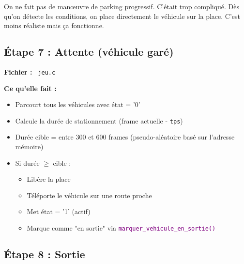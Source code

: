 \documentclass[11pt,a4paper]{article}
\newcommand{\fichier}[1]{\texttt{\textcolor{primary}{\faIcon{file-code} #1}}}
\newcommand{\fonction}[1]{\texttt{\textcolor{purple}{#1()}}}
\newcommand{\variable}[1]{\texttt{\textcolor{success}{#1}}}
\begin{document}
\begin{dangerbox}[Téléportation]
On ne fait pas de manœuvre de parking progressif. C'était trop compliqué. Dès qu'on détecte les conditions, on place directement le véhicule sur la place. C'est moins réaliste mais ça fonctionne.
\end{dangerbox}

\subsection{Étape 7 : Attente (véhicule garé)}

\begin{funcbox}
\textbf{Fichier :} \fichier{jeu.c}

\textbf{Ce qu'elle fait :}
\begin{itemize}[noitemsep]
    \item Parcourt tous les véhicules avec état = '0'
    \item Calcule la durée de stationnement (frame actuelle - \variable{tps})
    \item Durée cible = entre 300 et 600 frames (pseudo-aléatoire basé sur l'adresse mémoire)
    \item Si durée $\geq$ cible :
    \begin{itemize}[noitemsep]
        \item Libère la place
        \item Téléporte le véhicule sur une route proche
        \item Met état = '1' (actif)
        \item Marque comme "en sortie" via \fonction{marquer\_vehicule\_en\_sortie}
    \end{itemize}
\end{itemize}
\end{funcbox}

\subsection{Étape 8 : Sortie}
\end{document}
